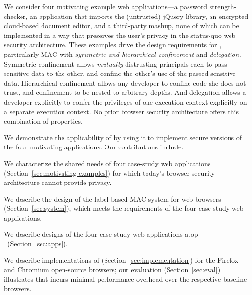 We consider four motivating example web ap\-pli\-ca\-tions---a
password strength-checker, an application that imports the (untrusted)
jQuery library, an encrypted cloud-based document editor, and a
third-party mashup, none of which can be implemented in a way that
preserves the user's privacy in the status-quo web security
architecture. These examples drive the design requirements for \sys{},
particularly MAC with \emph{symmetric and hierarchical confinement} and
{\em delegation.}  Symmetric confinement allows \emph{mutually}
distrusting principals each to pass sensitive data to the other, and
confine the other's use of the passed sensitive data. Hierarchical
confinement allows any developer to confine code she does not trust,
and confinement to be nested to arbitrary depths. And delegation
allows a developer explicitly to confer the privileges of one execution
context explicitly on a separate execution context.
%
No prior browser security architecture offers this combination of
properties.

We demonstrate the applicability of \sys{} by using it to implement
secure versions of the four motivating applications.
Our contributions include:

\begin{CompactItemize}
\item We characterize the shared needs of four case-study web applications
  (Section~\ref{sec:motivating-examples}) for which today's browser
  security architecture cannot provide privacy.
\item We describe the design of the \sys{} label-based MAC system
  for web browsers (Section~\ref{sec:system}), which meets the
  requirements of the four case-study web applications.
\item We describe designs of the four case-study web applications atop
  \sys~(Section~\ref{sec:apps}).
\item We describe implementations of \sys{}
  (Section~\ref{sec:implementation}) for the Firefox and Chromium
  open-source browsers; our evaluation (Section~\ref{sec:eval})
  illustrates that \sys{} incurs minimal performance overhead over the
  respective baseline browsers.
\end{CompactItemize}

